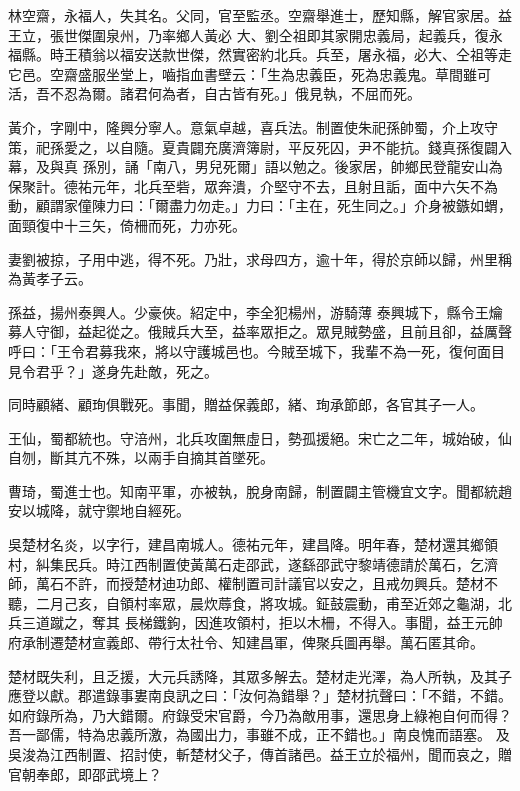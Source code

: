 \begin{pinyinscope}
 林空齋，永福人，失其名。父同，官至監丞。空齋舉進士，歷知縣，解官家居。益王立，張世傑圍泉州，乃率鄉人黃必
 大、劉仝祖即其家開忠義局，起義兵，復永福縣。時王積翁以福安送款世傑，然實密約北兵。兵至，屠永福，必大、仝祖等走它邑。空齋盛服坐堂上，嚙指血書壁云：「生為忠義臣，死為忠義鬼。草間雖可活，吾不忍為爾。諸君何為者，自古皆有死。」俄見執，不屈而死。



 黃介，字剛中，隆興分寧人。意氣卓越，喜兵法。制置使朱祀孫帥蜀，介上攻守策，祀孫愛之，以自隨。夏貴闢充廣濟簿尉，平反死囚，尹不能抗。錢真孫復闢入幕，及與真
 孫別，誦「南八，男兒死爾」語以勉之。後家居，帥鄉民登龍安山為保聚計。德祐元年，北兵至砦，眾奔潰，介堅守不去，且射且詬，面中六矢不為動，顧謂家僮陳力曰：「爾盡力勿走。」力曰：「主在，死生同之。」介身被鏃如蝟，面頸復中十三矢，倚柵而死，力亦死。



 妻劉被掠，子用中逃，得不死。乃壯，求母四方，逾十年，得於京師以歸，州里稱為黃孝子云。



 孫益，揚州泰興人。少豪俠。紹定中，李全犯楊州，游騎薄
 泰興城下，縣令王爚募人守御，益起從之。俄賊兵大至，益率眾拒之。眾見賊勢盛，且前且卻，益厲聲呼曰：「王令君募我來，將以守護城邑也。今賊至城下，我輩不為一死，復何面目見令君乎？」遂身先赴敵，死之。



 同時顧緒、顧珣俱戰死。事聞，贈益保義郎，緒、珣承節郎，各官其子一人。



 王仙，蜀都統也。守涪州，北兵攻圍無虛日，勢孤援絕。宋亡之二年，城始破，仙自刎，斷其亢不殊，以兩手自摘其首墜死。



 曹琦，蜀進士也。知南平軍，亦被執，脫身南歸，制置闢主管機宜文字。聞都統趙安以城降，就守禦地自經死。



 吳楚材名炎，以字行，建昌南城人。德祐元年，建昌降。明年春，楚材還其鄉領村，糾集民兵。時江西制置使黃萬石走邵武，遂繇邵武守黎靖德請於萬石，乞濟師，萬石不許，而授楚材迪功郎、權制置司計議官以安之，且戒勿興兵。楚材不聽，二月己亥，自領村率眾，晨炊蓐食，將攻城。鉦鼓震動，甫至近郊之龜湖，北兵三道蹴之，奪其
 長梯鐵鉤，因進攻領村，拒以木柵，不得入。事聞，益王元帥府承制遷楚材宣義郎、帶行太社令、知建昌軍，俾聚兵圖再舉。萬石匿其命。



 楚材既失利，且乏援，大元兵誘降，其眾多解去。楚材走光澤，為人所執，及其子應登以獻。郡遣錄事婁南良訊之曰：「汝何為錯舉？」楚材抗聲曰：「不錯，不錯。如府錄所為，乃大錯爾。府錄受宋官爵，今乃為敵用事，還思身上綠袍自何而得？吾一鄙儒，特為忠義所激，為國出力，事雖不成，正不錯也。」南良愧而語塞。
 及吳浚為江西制置、招討使，斬楚材父子，傳首諸邑。益王立於福州，聞而哀之，贈官朝奉郎，即邵武境上？



\end{pinyinscope}